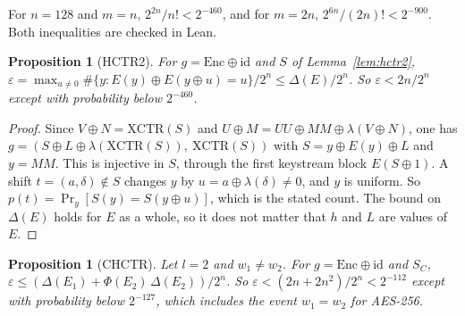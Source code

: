 \documentclass[11pt]{article}
\newtheorem{proposition}[theorem]{Proposition}
\theoremstyle{definition}
\theoremstyle{remark}
\newcommand{\Enc}{\mathrm{Enc}}
\newcommand{\XCTR}{\mathrm{XCTR}}
\newcommand{\eps}{\varepsilon}
\newcommand{\Dl}{\Delta}
\begin{document}
For $n=128$ and $m=n$, $2^{2n}/n!<2^{-460}$, and for $m=2n$, $2^{6n}/(2n)!<2^{-900}$. Both inequalities are checked in Lean.

\begin{proposition}[HCTR2]\label{prop:hctr2}
For $g=\Enc\oplus\mathrm{id}$ and $S$ of Lemma~\ref{lem:hctr2}, $\eps=\max_{u\ne0}\#\{y:E(y)\oplus E(y\oplus u)=u\}/2^n\le\Dl(E)/2^n$. So $\eps<2n/2^n$ except with probability below $2^{-460}$.
\end{proposition}

\begin{proof}
Since $V\oplus N=\XCTR(S)$ and $U\oplus M=UU\oplus MM\oplus\lambda(V\oplus N)$, one has $g=(S\oplus L\oplus\lambda(\XCTR(S)),\ \XCTR(S))$ with $S=y\oplus E(y)\oplus L$ and $y=MM$. This is injective in $S$, through the first keystream block $E(S\oplus1)$. A shift $t=(a,\delta)\notin S$ changes $y$ by $u=a\oplus\lambda(\delta)\ne0$, and $y$ is uniform. So $p(t)=\Pr_y[S(y)=S(y\oplus u)]$, which is the stated count. The bound on $\Dl(E)$ holds for $E$ as a whole, so it does not matter that $h$ and $L$ are values of $E$.
\end{proof}

\begin{proposition}[CHCTR]\label{prop:chctr}
Let $l=2$ and $w_1\ne w_2$. For $g=\Enc\oplus\mathrm{id}$ and $S_C$, $\eps\le(\Dl(E_1)+\Phi(E_2)\,\Dl(E_2))/2^n$. So $\eps<(2n+2n^2)/2^n<2^{-112}$ except with probability below $2^{-127}$, which includes the event $w_1=w_2$ for AES-256.
\end{proposition}
\end{document}
